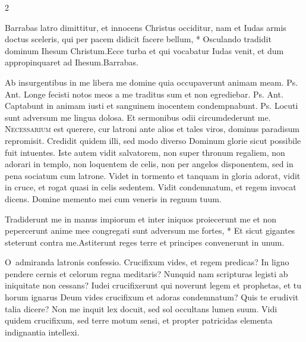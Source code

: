 \begin{multicols*}{2}
\begin{responsory}
{Barrabas latro dimittitur, et innocens Christus occiditur, nam et Iudas armis doctus sceleris, qui per pacem didicit facere bellum, * Osculando tradidit dominum Ihesum Christum.}{Ecce turba et qui vocabatur Iudas venit, et dum appropinquaret ad Ihesum.}Barrabas.
\end{responsory}%
 Ab insurgentibus in me libera me domine quia occupaverunt animam meam. {\color{Red} Ps.}  {\color{Red} Ant.} Longe fecisti notos meos a me traditus sum et non egrediebar. {\color{Red} Ps.}  {\color{Red} Ant.} Captabunt in animam iusti et sanguinem inocentem condempnabunt. {\color{Red} Ps.}  \V Locuti sunt adversum me lingua dolosa. \R Et sermonibus odii circumdederunt me.
\lettrine[lines=2]{\zallmancaps \color{Blue} N}{ecessarium} est querere, cur latroni ante alios et tales viros, dominus paradisum repromisit. Credidit quidem illi, sed modo diverso Dominum glorie sicut possibile fuit intuentes. Iste autem vidit salvatorem, non super thronum regaliem, non adorari in templo, non loquentem de celis, non per angelos disponentem, sed in pena sociatum cum latrone. Videt in tormento et tanquam in gloria adorat, vidit in cruce, et rogat quasi in celis sedentem. Vidit condemnatum, et regem invocat dicens. Domine memento mei cum veneris in regnum tuum.
\begin{responsory}[tradiderunt-me]
{Tradiderunt me in manus impiorum et inter iniquos proiecerunt me et non pepercerunt anime mee congregati sunt adversum me fortes, * Et sicut gigantes steterunt contra me.}{Astiterunt reges terre et principes convenerunt in unum.}
\end{responsory}%
\lettrine[lines=2]{\zallmancaps \color{Red} O}{}\ admiranda latronis confessio. Crucifixum vides, et regem predicas? In ligno pendere cernis et celorum regna meditaris? Nunquid nam scripturas legisti ab iniquitate non cessans? Iudei crucifixerunt qui noverunt legem et prophetas, et tu horum ignarus Deum vides crucifixum et adoras condemnatum? Quis te erudivit talia dicere? Non me inquit lex docuit, sed sol occultans lumen suum. Vidi quidem crucifixum, sed terre motum sensi, et propter patricidas elementa indignantia intellexi.
\begin{responsory}

\end{responsory}
\end{multicols*}
